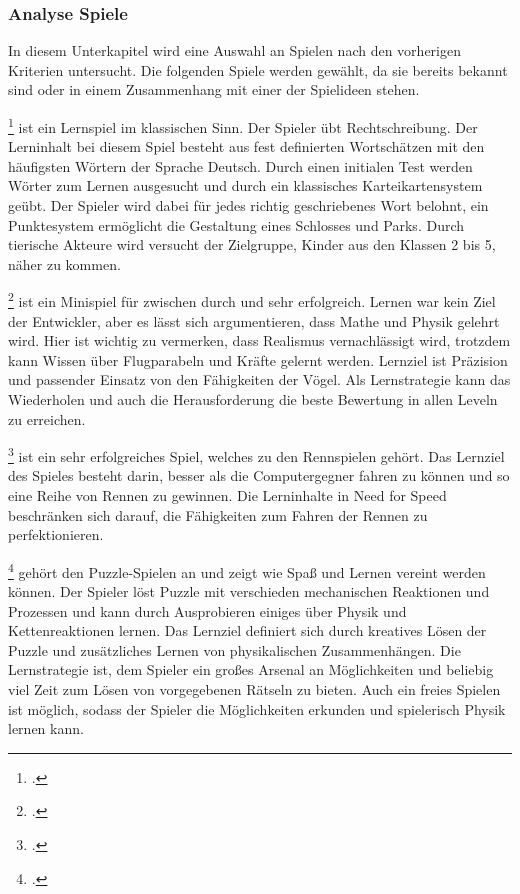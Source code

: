 	\subsubsection{Analyse Spiele}\label{sssec:lernspielanalyse}
		In diesem Unterkapitel wird eine Auswahl an Spielen nach den vorherigen Kriterien untersucht. Die folgenden Spiele werden gewählt, da sie bereits bekannt sind oder in einem Zusammenhang mit einer der Spielideen stehen.
		\begin{description}\obeylines
			\item[Gut]{
				\footcite{game-gut} ist ein Lernspiel im klassischen Sinn. Der Spieler übt Rechtschreibung.
				Der Lerninhalt bei diesem Spiel besteht aus fest definierten Wortschätzen mit den häufigsten Wörtern der Sprache Deutsch.
				Durch einen initialen Test werden Wörter zum Lernen ausgesucht und durch ein klassisches Karteikartensystem geübt. Der Spieler wird dabei für jedes richtig geschriebenes Wort belohnt, ein Punktesystem ermöglicht die Gestaltung eines Schlosses und Parks. Durch tierische Akteure wird versucht der Zielgruppe, Kinder aus den Klassen 2 bis 5, näher zu kommen.
			}
			\item[Angry Birds]{
				\footcite{game-angrybirds} ist ein Minispiel für zwischen durch und sehr erfolgreich. Lernen war kein Ziel der Entwickler, aber es lässt sich argumentieren, dass Mathe und Physik gelehrt wird. Hier ist wichtig zu vermerken, dass Realismus vernachlässigt wird, trotzdem kann Wissen über Flugparabeln und Kräfte gelernt werden.
				Lernziel ist Präzision und passender Einsatz von den Fähigkeiten der Vögel.
				Als Lernstrategie kann das Wiederholen und auch die Herausforderung die beste Bewertung in allen Leveln zu erreichen.
			}
			\item[Need for Speed]{
				\footcite{game-nfs} ist ein sehr erfolgreiches Spiel, welches zu den Rennspielen gehört.
				Das Lernziel des Spieles besteht darin, besser als die Computergegner fahren zu können und so eine Reihe von Rennen zu gewinnen.
				Die Lerninhalte in Need for Speed beschränken sich darauf, die Fähigkeiten zum Fahren der Rennen zu perfektionieren.
			}
			\item[Crazy Machines]{
				\footcite{game-crazymachine} gehört den Puzzle-Spielen an und zeigt wie Spaß und Lernen vereint werden können. Der Spieler löst Puzzle mit verschieden mechanischen Reaktionen und Prozessen und kann durch Ausprobieren einiges über Physik und Kettenreaktionen lernen.
				Das Lernziel definiert sich durch kreatives Lösen der Puzzle und zusätzliches Lernen von physikalischen Zusammenhängen.
				Die Lernstrategie ist, dem Spieler ein großes Arsenal an Möglichkeiten und beliebig viel Zeit zum Lösen von vorgegebenen Rätseln zu bieten. Auch ein freies Spielen ist möglich, sodass der Spieler die Möglichkeiten erkunden und spielerisch Physik lernen kann.
				}
		\end{description}
